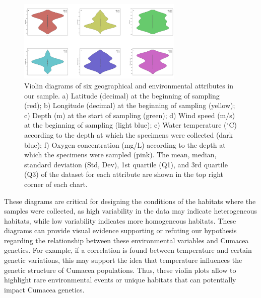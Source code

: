 \begin{figure}[htbp]
    \centering
    \includegraphics[width=0.7\textwidth]{figure1.jpg}
    \caption{Violin diagrams of six geographical and environmental attributes in our sample. a) Latitude (decimal) at the beginning of sampling (red); b) Longitude (decimal) at the beginning of sampling (yellow); c) Depth (m) at the start of sampling (green); d) Wind speed (m/s) at the beginning of sampling (light blue); e) Water temperature ($^\circ$C) according to the depth at which the specimens were collected (dark blue); f) Oxygen concentration (mg/L) according to the depth at which the specimens were sampled (pink). The mean, median, standard deviation (Std, Dev), 1st quartile (Q1), and 3rd quartile (Q3) of the dataset for each attribute are shown in the top right corner of each chart. \label{fig:fig1}}
\end{figure}

These diagrams are critical for designing the conditions of the habitats where the samples were collected, as high variability in the data may indicate heterogeneous habitats, while low variability indicates more homogeneous habitats. These diagrams can provide visual evidence supporting or refuting our hypothesis regarding the relationship between these environmental variables and Cumacea genetics. For example, if a correlation is found between temperature and certain genetic variations, this may support the idea that temperature influences the genetic structure of Cumacea populations. Thus, these violin plots allow to highlight rare environmental events or unique habitats that can potentially impact Cumacea genetics.

